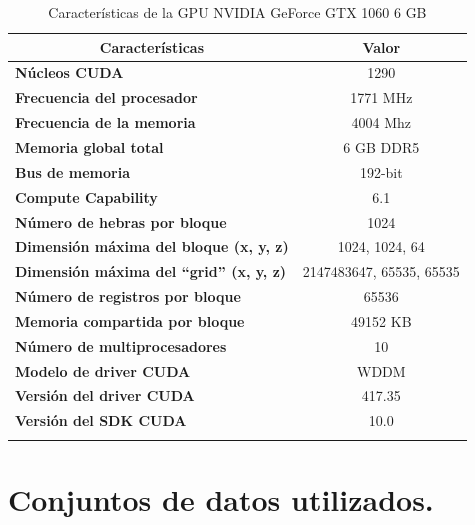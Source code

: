 \begin{longtable}{@{}lc@{}}
\toprule
\multicolumn{1}{c}{\textbf{Características}}     & \textbf{Valor}           \\* \midrule
\endfirsthead
%
\endhead
%
\bottomrule
\endfoot
%
\endlastfoot
%
\textbf{Núcleos CUDA}                            & 1290                     \\
\textbf{Frecuencia del procesador}               & 1771 MHz                 \\
\textbf{Frecuencia de la memoria}                & 4004 Mhz                 \\
\textbf{Memoria global total}                    & 6 GB DDR5                \\
\textbf{Bus de memoria}                          & 192-bit                  \\
\textbf{Compute Capability}                      & 6.1                      \\
\textbf{Número de hebras por bloque}             & 1024                     \\
\textbf{Dimensión máxima del bloque (x, y, z)}   & 1024, 1024, 64           \\
\textbf{Dimensión máxima del ``grid'' (x, y, z)} & 2147483647, 65535, 65535 \\
\textbf{Número de registros por bloque}          & 65536                    \\
\textbf{Memoria compartida por bloque}           & 49152 KB                 \\
\textbf{Número de multiprocesadores}             & 10                       \\
\textbf{Modelo de driver CUDA}                   & WDDM                     \\
\textbf{Versión del driver CUDA}                 & 417.35                   \\
\textbf{Versión del SDK CUDA}                    & 10.0                     \\* \bottomrule
\caption{Características de la GPU NVIDIA GeForce GTX 1060 6 GB}
\label{tab:esptec}\\
\end{longtable}

\section{Conjuntos de datos utilizados.}

